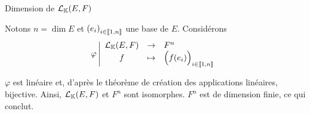 \documentclass{article}
\begin{document}
	\begin{question_kholle}
		[$\mathcal{L}_\K(E,F)$ est dimension finie et
		\begin{equation}
			\dim \mathcal{L}_\K(E,F) = \dim E \times \dim F
		\end{equation}]
		{Dimension de $\mathcal{L}_\K(E,F)$}
		
		Notons $n = \dim E$ et $\left(e_i\right)_{i \in [\![ 1 , n ]\!]}$ une base de $E$. Considérons
		\begin{equation*}
			\varphi
			\left| \begin{array}{ccl}
				\mathcal{L}_{\mathbb K}(E,F) &\to &F^n \\
				f &\mapsto &\Big( f(e_i) \Big)_{i \in [\![ 1 , n ]\!]}
			\end{array} \right.
		\end{equation*}
		
		$\varphi$ est linéaire et, d'après le théorème de création des applications linéaires, bijective.
		Ainsi, $\mathcal{L}_\K(E,F)$ et $F^n$ sont isomorphes. $F^n$ est de dimension finie, ce qui conclut.
	\end{question_kholle}
	
\end{document}
